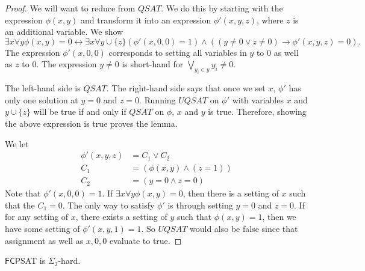 \documentclass[runningheads,a4paper]{llncs}
\begin{document}
\begin{proof}
We will want to reduce from $QSAT$. We do this by starting with the expression $\phi(x,y)$ and transform it into an expression $\phi'(x, y, z)$, where $z$ is an additional variable. We show
\[ \exists x \forall y \phi(x,y) = 0 \leftrightarrow \exists x \forall y\cup \{z\} \left(\phi'(x, 0, 0) = 1 \right) \wedge \left((y \neq 0 \vee z \neq 0 ) \rightarrow \phi'(x, y, z) = 0 \right). \]
The expression $\phi'(x, 0, 0)$ corresponds to setting all variables in $y$ to $0$ as well as $z$ to 0. The expression $y \neq 0$ is short-hand for $\bigvee_{y_i \in y} y_i \neq 0$. 

The left-hand side is $QSAT$. The right-hand side says that once we set $x$, $\phi'$ has only one solution at $y=0$ and $z = 0$. Running $UQSAT$ on $\phi'$ with variables $x$ and $y \cup \{z\}$ will be true if and only if $QSAT$ on $\phi$, $x$ and $y$ is true. Therefore, showing the above expression is true proves the lemma.

We let 
\begin{align}
\phi'(x, y, z) &= C_1 \vee C_2 \\
		    C_1 &=\left(\phi(x, y) \wedge (z = 1)\right) \\
		   C_2 &=  \left( y = 0 \wedge z = 0 \right) 
\end{align}
Note that $\phi'(x, 0, 0) = 1$. If $\exists x \forall y \phi(x, y)= 0$, then there is a setting of $x$ such that the $C_1 = 0$. The only way to satisfy $\phi'$ is through setting $y = 0$ and $z = 0$. If for any setting of $x$, there exists a setting of $y$ such that $\phi(x, y) = 1$, then we have some setting of $\phi'(x, y, 1) = 1$. So $UQSAT$ would also be false since that assignment as well as $x, 0, 0$ evaluate to true.
\end{proof}

\begin{proposition}
\label{prop:fcpsatsigmacomp}
$\mathsf{FCP} $SAT is $\Sigma_2$-hard.
\end{proposition}
\end{document}
